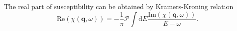\documentclass[preprint,prb,amsmath,superscriptaddress,showpacs]{revtex4}
\begin{document}
The real part of susceptibility can be obtained by
Kramers-Kroning relation
%
\begin{equation}
\mathrm{Re} (\chi(\mathbf{q}, \omega)) = - \frac{1}{\pi} \mathcal{P} \int
\mathrm{d} E \frac{\mathrm{Im} (\chi(\mathbf{q}, \omega))}{E - \omega}.
\end{equation}
%

\iffalse
Using RPA approximation we can further write spectral function
$A(\mathbf{k}, E)$ as
%
\begin{equation}
A(\mathbf{k}, E) = - \frac{1}{\pi} \mathrm{Im} (G_{\mathrm{ret}}(\mathbf{k}, E)) =
\frac{1}{\pi} \frac{-\mathrm{Im}(\Sigma)}{\left( E -
    \varepsilon_{\mathbf{k}} + \mu - \mathrm{Re}(\Sigma) \right)^2 + (\mathrm{Im}(\Sigma))^2}.
\end{equation}
%
Here, $\Sigma$ marks RPA self-energy.
\fi
\end{document}
